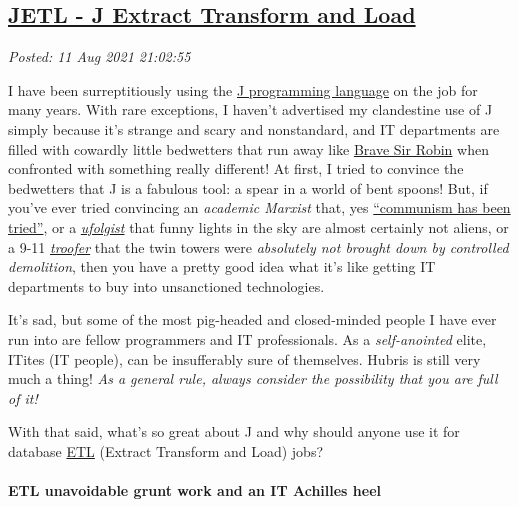 %

\subsection*{\href{http://analyzethedatanotthedrivel.org/2021/08/11/jetl-j-extract-transform-and-load/}{JETL - J Extract Transform and Load}}


\noindent\emph{Posted: 11 Aug 2021 21:02:55}
\vspace{6pt}

    I have been surreptitiously using the
\href{https://code.jsoftware.com/wiki/NuVoc}{J programming language} on
the job for many years. With rare exceptions, I haven't advertised my
clandestine use of J simply because it's strange and scary and
nonstandard, and IT departments are filled with cowardly little
bedwetters that run away like
\href{https://www.youtube.com/watch?v=BZwuTo7zKM8}{Brave Sir Robin} when
confronted with something really different! At first, I tried to
convince the bedwetters that J is a fabulous tool: a spear in a world of
bent spoons! But, if you've ever tried convincing an \emph{academic
Marxist} that, yes
\href{https://www.quora.com/Why-do-communists-insist-that-real-communism-has-never-been-tried?share=1}{``communism
has been tried''}, or a \href{https://www.urbandictionary.com/define.php?term=Ufologist}{\emph{ufolgist}} that funny lights in the sky are
almost certainly not aliens, or a 9-11 \href{https://www.urbandictionary.com/define.php?term=troofer}{\emph{troofer}} that the twin
towers were \emph{absolutely not brought down by controlled demolition},
then you have a pretty good idea what it's like getting IT departments
to buy into unsanctioned technologies.

It's sad, but some of the most pig-headed and closed-minded people I
have ever run into are fellow programmers and IT professionals. As a
\emph{self-anointed} elite, ITites (IT people), can be insufferably sure
of themselves. Hubris is still very much a thing! \emph{As a general
rule, always consider the possibility that you are full of it!}

With that said, what's so great about J and why should anyone use it for
database \href{https://www.ibm.com/cloud/learn/etl}{ETL} (Extract
Transform and Load) jobs?

    \hypertarget{etl-unavoidable-grunt-work-and-an-it-achilles-heel}{%
\paragraph{ETL unavoidable grunt work and an IT Achilles
heel}\label{etl-unavoidable-grunt-work-and-an-it-achilles-heel}}

